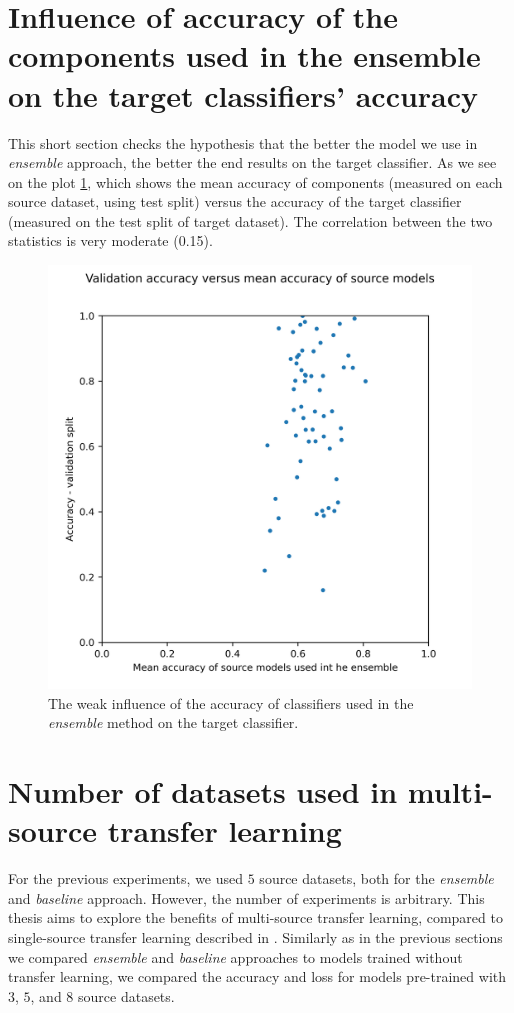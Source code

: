 \documentclass[a4paper,11pt,twoside]{report}
\theoremstyle{definition}
\begin{document}
\section{Influence of accuracy of the components used in the ensemble on the target classifiers' accuracy}
This short section checks the hypothesis that the better the model we use in \textit{ensemble} approach, the better the end results on the target classifier. As we see on the plot \ref{fig:acc_source_vs_acc_target}, which shows the mean accuracy of components (measured on each source dataset, using test split) versus the accuracy of the target classifier (measured on the test split of target dataset). The correlation between the two statistics is very moderate (0.15).
\FloatBarrier
\begin{figure}[h!t]
\centering
\includegraphics[width=17cm]{imgs/ensemble/source_acc_vs_val.png}
\caption{The weak influence of the accuracy of classifiers used in the \textit{ensemble} method on the target classifier.}
\label{fig:acc_source_vs_acc_target}
\end{figure}
\FloatBarrier
\section{Number of datasets used in multi-source transfer learning}
For the previous experiments, we used $5$ source datasets, both for the \textit{ensemble} and \textit{baseline} approach. However, the number of experiments is arbitrary. This thesis aims to explore the benefits of multi-source transfer learning, compared to single-source transfer learning described in \cite{transfer_learning_time_series}. Similarly as in the previous sections we compared \textit{ensemble} and \textit{baseline} approaches to models trained without transfer learning, we compared the accuracy and loss for models pre-trained with $3$, $5$, and $8$ source datasets.
\end{document}
